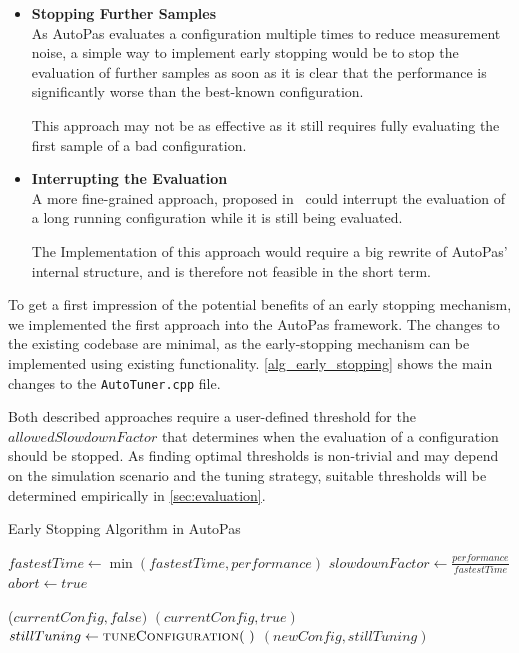 \documentclass[conference]{IEEEtran}
\begin{document}
\begin{itemize}
    \item \textbf{Stopping Further Samples}\\
          As AutoPas evaluates a configuration multiple times to reduce measurement noise, a simple way to implement early stopping would be to stop the evaluation of further samples as soon as it is clear that the performance is significantly worse than the best-known configuration.

          This approach may not be as effective as it still requires fully evaluating the first sample of a bad configuration.
    \item \textbf{Interrupting the Evaluation}\\
          A more fine-grained approach, proposed in~\cite{endreport.pdf} could interrupt the evaluation of a long running configuration while it is still being evaluated.

          The Implementation of this approach would require a big rewrite of AutoPas' internal structure, and is therefore not feasible in the short term.
\end{itemize}

To get a first impression of the potential benefits of an early stopping mechanism, we implemented the first approach into the AutoPas framework. The changes to the existing codebase are minimal, as the early-stopping mechanism can be implemented using existing functionality. \autoref{alg_early_stopping} shows the main changes to the \texttt{AutoTuner.cpp} file.

Both described approaches require a user-defined threshold for the $allowedSlowdownFactor$ that determines when the evaluation of a configuration should be stopped. As finding optimal thresholds is non-trivial and may depend on the simulation scenario and the tuning strategy, suitable thresholds will be determined empirically in \autoref{sec:evaluation}.

\begin{algorithm}[h]
    \small
    \caption{Early Stopping Algorithm in AutoPas}
    \label{alg_early_stopping}
    \begin{algorithmic}[1]
        \State $fastestTime \gets \min(fastestTime, performance)$
        \State $slowdownFactor \gets \frac{performance}{fastestTime}$
        \State $abort \gets true$
        \EndIf
        \EndProcedure

        \vspace{0.5em}

        \State \Return ($currentConfig, false)$
            \State \Return $(currentConfig, true)$
            \Else
            \State $stillTuning \gets \Call{tuneConfiguration}{~}$
            \State \Return $(newConfig, stillTuning)$
        \EndIf
        \EndProcedure
    \end{algorithmic}
\end{algorithm}
\end{document}
